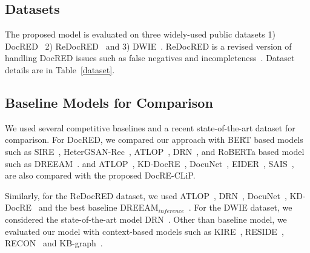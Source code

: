 \documentclass[letterpaper]{article} %
\begin{document}
\subsection{Datasets}
The proposed model is evaluated on three widely-used public datasets 1) DocRED~\cite{yao-etal-2019-docred} 2) ReDocRED~\cite{DBLP:conf/eacl/MaWO23} and 3) DWIE~\cite{DBLP:journals/ipm/ZaporojetsDDD21}. ReDocRED is a revised version of handling DocRED issues such as false negatives and incompleteness~\cite{DBLP:conf/emnlp/Tan0BNA22}. Dataset details are in Table~\ref{dataset}.
\begin{table}[ht] 
\caption{Dataset statistics}
    \label{dataset}   
\end{table}



\subsection{Baseline Models for Comparison}
We used several competitive baselines and a recent state-of-the-art dataset for comparison. For DocRED, we compared our approach with  
BERT based models such as 
SIRE~\cite{zeng-etal-2021-sire},
HeterGSAN-Rec~\cite{DBLP:conf/aaai/XuCZ21},
ATLOP~\cite{DBLP:conf/aaai/Zhou0M021}, 
DRN~\cite{xu-etal-2021-discriminative}, and RoBERTa based model such as DREEAM~\cite{DBLP:conf/eacl/MaWO23}. 
and ATLOP~\cite{DBLP:conf/aaai/Zhou0M021}, 
KD-DocRE~\cite{tan-etal-2022-document}, 
DocuNet~\cite{ijcai2021p551}, 
EIDER~\cite{xie-etal-2022-eider}, SAIS~\cite{xiao-etal-2022-sais},
~\cite{DBLP:conf/aaai/Zhou0M021} are also compared with the proposed DocRE-CLiP. 

Similarly, for the ReDocRED dataset, we used 
ATLOP~\cite{DBLP:conf/aaai/Zhou0M021},
DRN~\cite{xu-etal-2021-discriminative},  
DocuNet~\cite{ijcai2021p551}, 
KD-DocRE~\cite{tan-etal-2022-document} and the best baseline
DREEAM$_{inference}$~\cite{DBLP:conf/eacl/MaWO23}. For the DWIE dataset, we considered the state-of-the-art model 
DRN~\cite{xu-etal-2021-discriminative}. Other than baseline model, we evaluated our model with context-based models such as KIRE~\cite{DBLP:conf/semweb/WangWSH22}, RESIDE~\cite{vashishth-etal-2018-reside}, RECON~\cite{DBLP:conf/www/BastosN0MSHK21} and KB-graph~\cite{DBLP:conf/acl/VerlindenZDDD21}.
\end{document}
